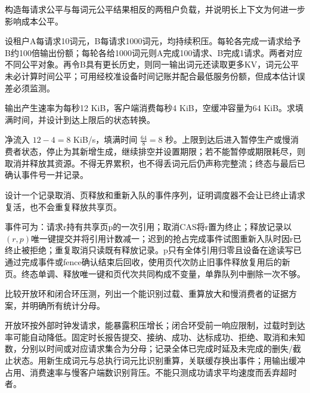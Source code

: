 \begin{exercises}
\begin{exercise}\optional 构造每请求公平与每词元公平结果相反的两租户负载，并说明长上下文为何进一步影响成本公平。

\begin{solution}
设租户A每请求10词元，B每请求1000词元，均持续积压。每轮各完成一请求给予B约100倍输出份额；每轮各给1000词元则A完成100请求、B完成1请求。两者对应不同公平对象。再令B具有更长历史，则同一输出词元还读取更多KV，词元公平未必计算时间公平；可用经校准设备时间记账并配合最低服务份额，但成本估计误差必须监测。
\end{solution}
\end{exercise}

\begin{exercise} 输出产生速率为每秒12 KiB，客户端消费每秒4 KiB，空缓冲容量为64 KiB。求填满时间，并设计到达上限后的状态转换。

\begin{solution}
净流入 $12-4=8$ KiB/s，填满时间 $\frac{64}{8}=8$ 秒。上限到达后进入暂停生产或慢消费者状态，停止为其新增生成，继续排空并设置期限；若不能暂停或期限耗尽，则取消并释放其资源。不得无界累积，也不得丢词元后仍声称完整流；终态与最后已确认事件号一并记录。
\end{solution}
\end{exercise}

\begin{exercise} 设计一个记录取消、页释放和重新入队的事件序列，证明调度器不会让已终止请求复活，也不会重复释放共享页。

\begin{solution}
事件可为：请求r持有共享页p的一次引用；取消CAS将r置为终止；释放记录以$(r,p)$唯一键提交并将引用计数减一；迟到的抢占完成事件试图重新入队时因r已终止被拒绝；重复取消只读既有释放记录。p只有全体引用归零且设备在途读写已通过完成事件或fence确认结束后回收，使用页代次防止旧事件释放复用后的新页。终态单调、释放唯一键和页代次共同构成不变量，单靠队列中删除一次不够。
\end{solution}
\end{exercise}

\begin{exercise} 比较开放环和闭合环压测，列出一个能识别过载、重算放大和慢消费者的证据方案，并明确所有统计分母。

\begin{solution}
开放环按外部时钟发请求，能暴露积压增长；闭合环受前一响应限制，过载时到达率可能自动降低。固定时长报告提交、接纳、成功、达标成功、拒绝、取消和未知数，分别以时间或对应请求集合为分母；记录全体已完成时延及未完成的删失/截止状态。用新生成词元与总执行词元比识别重算，关联缓存换出事件；用输出缓冲占用、消费速率与慢客户端数识别背压。不能只测成功请求平均速度而丢弃超时者。
\end{solution}
\end{exercise}


\end{exercises}
